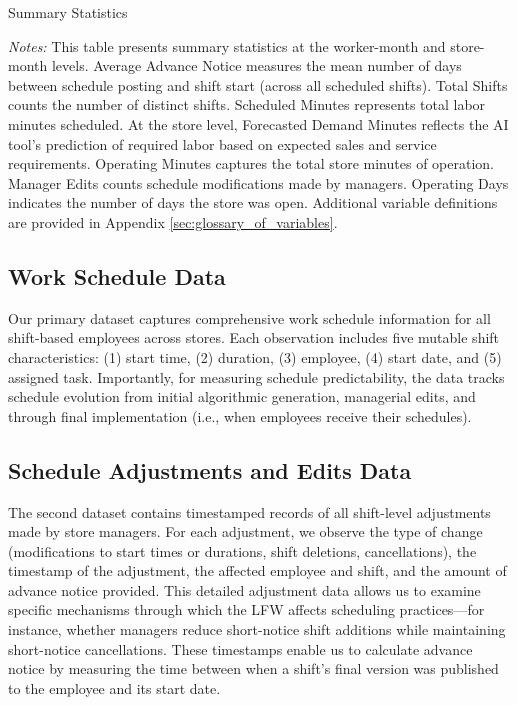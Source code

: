 \documentclass[letterpaper,11pt,leqno]{article}
\theoremstyle{paper}
\newcommand{\note}[2][]{\parbox{\textwidth}{\footnotesize\vspace*{10pt}\textit{#1}#2}}
\begin{document}
\begin{singlespace}
\begin{table}[h]
\caption{Summary Statistics}

\note{\textit{Notes:} \scriptsize This table presents summary statistics at the worker-month and store-month levels. Average Advance Notice measures the mean number of days between schedule posting and shift start (across all scheduled shifts). Total Shifts counts the number of distinct shifts. Scheduled Minutes represents total labor minutes scheduled. At the store level, Forecasted Demand Minutes reflects the AI tool's prediction of required labor based on expected sales and service requirements. Operating Minutes captures the total store minutes of operation. Manager Edits counts schedule modifications made by managers. Operating Days indicates the number of days the store was open. Additional variable definitions are provided in Appendix \ref{sec:glossary_of_variables}.}
\label{table:sum_stats_all}
\end{table}
\end{singlespace}


\subsection{Work Schedule Data} \label{subsec:data_versions}
Our primary dataset captures comprehensive work schedule information for all shift-based employees across stores. Each observation includes five mutable shift characteristics: (1) start time, (2) duration, (3) employee, (4) start date, and (5) assigned task. Importantly, for measuring schedule predictability, the data tracks schedule evolution from initial algorithmic generation, managerial edits, and through final implementation (i.e., when employees receive their schedules). 

\subsection{Schedule Adjustments and Edits Data} \label{subsec:data_adjustments}
The second dataset contains timestamped records of all shift-level adjustments made by store managers. For each adjustment, we observe the type of change (modifications to start times or durations, shift deletions, cancellations), the timestamp of the adjustment, the affected employee and shift, and the amount of advance notice provided. This detailed adjustment data allows us to examine specific mechanisms through which the LFW affects scheduling practices—for instance, whether managers reduce short-notice shift additions while maintaining short-notice cancellations. These timestamps enable us to calculate advance notice by measuring the time between when a shift's final version was published to the employee and its start date.
\end{document}

